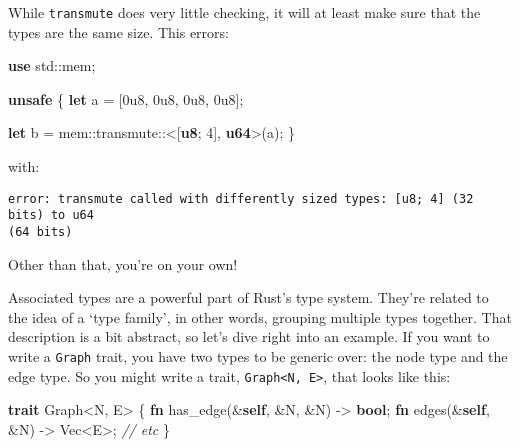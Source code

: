 \documentclass[a4paper,]{book}
\newenvironment{Shaded}{\begin{snugshade}}{\end{snugshade}}
\newcommand{\KeywordTok}[1]{\textcolor[rgb]{0.13,0.29,0.53}{\textbf{{#1}}}}
\newcommand{\DecValTok}[1]{\textcolor[rgb]{0.00,0.00,0.81}{{#1}}}
\newcommand{\CommentTok}[1]{\textcolor[rgb]{0.56,0.35,0.01}{\textit{{#1}}}}
\newcommand{\NormalTok}[1]{{#1}}
\begin{document}
While \texttt{transmute} does very little checking, it will at least
make sure that the types are the same size. This errors:

\begin{Shaded}
\begin{Highlighting}[]
\KeywordTok{use} \NormalTok{std::mem;}

\KeywordTok{unsafe} \NormalTok{\{}
    \KeywordTok{let} \NormalTok{a = [}\DecValTok{0u8}\NormalTok{, }\DecValTok{0u8}\NormalTok{, }\DecValTok{0u8}\NormalTok{, }\DecValTok{0u8}\NormalTok{];}

    \KeywordTok{let} \NormalTok{b = mem::transmute::<[}\KeywordTok{u8}\NormalTok{; }\DecValTok{4}\NormalTok{], }\KeywordTok{u64}\NormalTok{>(a);}
\NormalTok{\}}
\end{Highlighting}
\end{Shaded}

with:

\begin{verbatim}
error: transmute called with differently sized types: [u8; 4] (32 bits) to u64
(64 bits)
\end{verbatim}

Other than that, you're on your own!


Associated types are a powerful part of Rust's type system. They're
related to the idea of a `type family', in other words, grouping
multiple types together. That description is a bit abstract, so let's
dive right into an example. If you want to write a \texttt{Graph} trait,
you have two types to be generic over: the node type and the edge type.
So you might write a trait,
\texttt{Graph\textless{}N,\ E\textgreater{}}, that looks like this:

\begin{Shaded}
\begin{Highlighting}[]
\KeywordTok{trait} \NormalTok{Graph<N, E> \{}
    \KeywordTok{fn} \NormalTok{has_edge(&}\KeywordTok{self}\NormalTok{, &N, &N) -> }\KeywordTok{bool}\NormalTok{;}
    \KeywordTok{fn} \NormalTok{edges(&}\KeywordTok{self}\NormalTok{, &N) -> Vec<E>;}
    \CommentTok{// etc}
\NormalTok{\}}
\end{Highlighting}
\end{Shaded}
\end{document}
